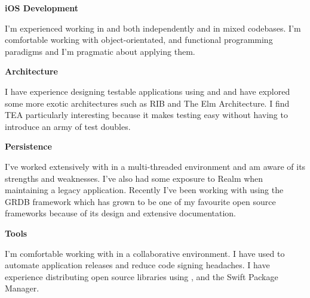 \textbf{iOS Development}

I'm experienced working in  and  both
independently and in mixed codebases. I'm comfortable working with
object-orientated,  and functional programming
paradigms and I'm pragmatic about applying them.

\smallskip

\textbf{Architecture}

I have experience designing testable applications using  and
 and have explored some more exotic architectures such as RIB and
The Elm Architecture. I find TEA particularly interesting because it makes
testing easy without having to introduce an army of test doubles.

\smallskip

\textbf{Persistence}

I've worked extensively with  in a multi-threaded environment
and am aware of its strengths and weaknesses. I've also had some exposure to
Realm when maintaining a legacy application. Recently I've been working with
 using the GRDB framework which has grown to be one of my
favourite open source frameworks because of its design and extensive
documentation.

\smallskip

\textbf{Tools}

I'm comfortable working with  in a collaborative environment. I have
used  to automate application releases and reduce code signing
headaches. I have experience distributing open source libraries using
,  and the Swift Package Manager.

